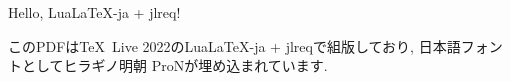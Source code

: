 \documentclass{jlreq}
\begin{document}
    Hello, Lua\LaTeX-ja + jlreq!

    このPDFは\TeX\ Live 2022のLua\LaTeX-ja + jlreqで組版しており, 日本語フォントとしてヒラギノ明朝 ProNが埋め込まれています.
\end{document}
